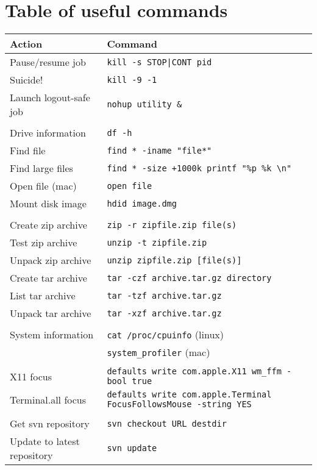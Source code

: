 \documentclass[a4paper,10pt]{article}
\begin{document}
\section{Table of useful commands}
\begin{table}[h]
\begin{small}
\begin{tabular}{ll}\hline\hline
Action              & Command \\\hline
Pause/resume job    & \verb"kill -s STOP|CONT pid" \\
Suicide!            & \verb"kill -9 -1"\\
Launch logout-safe job  & \verb"nohup utility &" \\
\\
Drive information   & \verb"df -h"\\
Find file           & \verb'find * -iname "file*"'\\
Find large files    & \verb'find * -size +1000k printf "%p %k \n"'\\
Open file (mac)     & \verb"open file"\\
Mount disk image    & \verb"hdid image.dmg"\\
\\
Create zip archive  & \verb"zip -r zipfile.zip file(s)"\\
Test zip archive    & \verb"unzip -t zipfile.zip"\\
Unpack zip archive  & \verb"unzip zipfile.zip [file(s)]"\\
Create tar archive  & \verb"tar -czf archive.tar.gz directory"\\
List tar archive    & \verb"tar -tzf archive.tar.gz"\\
Unpack tar archive  & \verb"tar -xzf archive.tar.gz"\\
\\
System information  & \verb"cat /proc/cpuinfo" (linux) \\
                    & \verb"system_profiler" (mac) \\
\\
X11 focus           & \verb"defaults write com.apple.X11 wm_ffm -bool true"\\
Terminal.all focus  & \verb"defaults write com.apple.Terminal FocusFollowsMouse -string YES"\\
\\
Get svn repository   & \verb"svn checkout URL destdir"\\
Update to latest repository & \verb"svn update"\\

\end{tabular}
\end{small}
\end{table}
\end{document}
